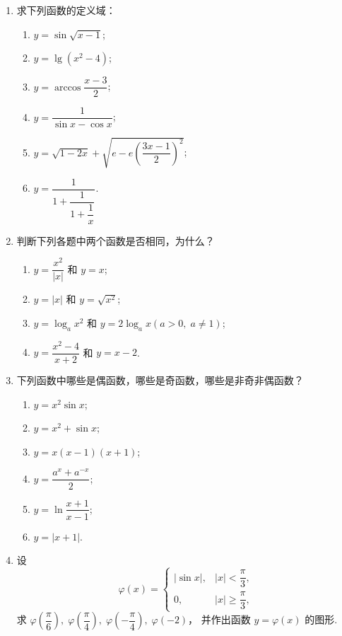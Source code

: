 \begin{enumerate}\setlength{\itemsep}{7pt}
    \item 求下列函数的定义域：
    \begin{enumerate}[(1)]\setlength{\itemsep}{5pt}\setlength{\topsep}{15pt}
        \item $y=\sin\sqrt{x-1}$;
        \item $y=\lg(x^2-4)$;
        \item $y=\arccos\dfrac{x-3}{2}$;
        \item $y=\dfrac{1}{\sin x-\cos x}$;
        \item $y=\sqrt{1-2x}+\sqrt{e-e\left(\dfrac{3x-1}{2}\right)^2}$;
        \item $y=\dfrac{1}{1+\dfrac{1}{1+\dfrac{1}{x}}}$.
    \end{enumerate}

    \item 判断下列各题中两个函数是否相同，为什么？
    \begin{enumerate}[(1)]\setlength{\itemsep}{5pt}\setlength{\topsep}{15pt}
        \item $y=\dfrac{x^2}{|x|}$ 和 $y=x$;
        \item $y=|x|$ 和 $y=\sqrt{x^2}$;
        \item $y=\log_ax^2$ 和 $y=2\log_ax(a>0,\;a\not=1)$;
        \item $y=\dfrac{x^2-4}{x+2}$ 和 $y=x-2$.
    \end{enumerate}

    \item 下列函数中哪些是偶函数，哪些是奇函数，哪些是非奇非偶函数？
    \begin{enumerate}[(1)]\setlength{\itemsep}{5pt}\setlength{\topsep}{15pt}
        \item $y=x^2\sin x$;
        \item $y=x^2+\sin x$;
        \item $y=x(x-1)(x+1)$;
        \item $y=\dfrac{a^x+a^{-x}}{2}$;
        \item $y=\ln\dfrac{x+1}{x-1}$;
        \item $y=|x+1|$.
    \end{enumerate}

    \item 设
    \[
        \varphi(x)=\begin{cases}
            |\sin x|,&|x|<\dfrac{\pi}{3},\\
            0,&|x|\geqslant\dfrac{\pi}{3},
        \end{cases}
    \]
    求 $\varphi\left(\dfrac{\pi}{6}\right),\;\varphi\left(\dfrac{\pi}{4}\right),\;\varphi\left(-\dfrac{\pi}{4}\right),\;\varphi\left(-2\right)$，
    并作出函数 $y=\varphi(x)$ 的图形.


\end{enumerate}
